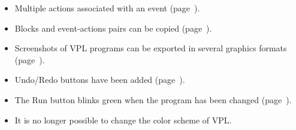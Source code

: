 \begin{itemize}

\item Multiple actions associated with an event (page~\pageref{p.multiple}).

\item Blocks and event-actions pairs can be copied
(page~\pageref{p.copy-pairs}).

\item Screenshots of VPL programs can be exported in several
 graphics formats (page~\pageref{p.export}).

\item Undo/Redo buttons have been added (page~\pageref{p.undo}).

\item The Run button blinks green when the program has been changed
(page~\pageref{p.blink}).


\item It is no longer possible to change the color scheme of VPL.

\end{itemize}
